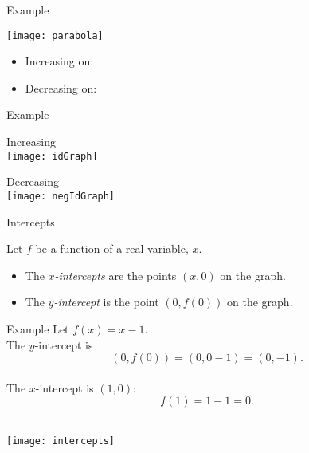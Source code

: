 \documentclass[Lecture.tex]{subfiles}
\begin{document}
\begin{frame}{Example}
  \begin{center}
    \texttt{[image: parabola]}
  \end{center}
  \begin{itemize}
  \item<2->
    Increasing on: 
  \item<2->
    Decreasing on: 
  \end{itemize}
\end{frame}

\begin{frame}{Example}
  \begin{multicols}{2}
    
  \begin{center}
    Increasing\\
    \texttt{[image: idGraph]}
  \end{center}
  \columnbreak
  \pause
  \begin{center}
    Decreasing\\
    \texttt{[image: negIdGraph]}
  \end{center}
  \end{multicols}
\end{frame}

\begin{frame}{Intercepts}
  \begin{defn}
    Let $f$ be a function of a real variable, $x$.
    \begin{itemize}
      \item<2->
        The {\it $x$-intercepts} are the points $(x,0)$ on the graph.
      \item<3->
        The {\it $y$-intercept} is the point $(0,f(0))$ on the graph.
    \end{itemize}
  \end{defn}
\end{frame}

\begin{frame}{Example}
  Let $f(x) = x - 1$.\\
  \pause
  The $y$-intercept is
  $$(0,f(0)) = (0, 0 - 1) = (0,-1).$$\\
  \pause
  The $x$-intercept is $(1,0)$:
  $$f(1) = 1 - 1 = 0.$$\\
  \pause
  \begin{center}
    \texttt{[image: intercepts]}
  \end{center}
\end{frame}
\end{document}
